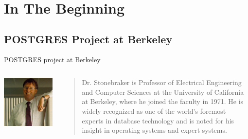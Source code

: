 \documentclass[t,10pt]{beamer}
\begin{document}
\section{In The Beginning}
\subsection{POSTGRES Project at Berkeley}

\begin{frame}[label=testing]{POSTGRES project at Berkeley}
  \begin{columns}[T]
    \begin{column}{0.3\textwidth}
      \includegraphics[width=\textwidth,keepaspectratio=true]{assets/stonebraker-1995-berkeley.png}
    \end{column}
    \begin{column}{0.7\textwidth}
      \begin{quotation}
        \setlength{\parskip}{1em}
        Dr. Stonebraker is Professor of Electrical Engineering and Computer
        Sciences at the University of California at Berkeley, where he joined
        the faculty in 1971. He is widely recognized as one of the world's
        foremost experts in database technology and is noted for his insight
        in operating systems and expert systems.


\end{quotation}
\end{column}
\end{columns}
\end{frame}
\end{document}

